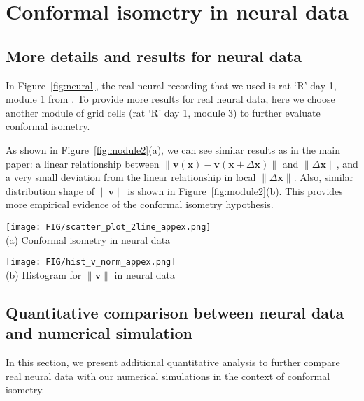 \documentclass{article}
\def\Figref#1{Figure~\ref{#1}}
\def\vv{{\bm{v}}}
\def\vx{{\bm{x}}}
\begin{document}
\section{Conformal isometry in neural data}\label{sec:neural_data}

\subsection{More details and results for neural data}
In \Figref{fig:neural}, the real neural recording that we used is rat ‘R’ day 1, module 1 from \cite{gardner2021toroidal}. To provide more results for real neural data, here we choose another module of grid cells (rat ‘R’ day 1, module 3) to further evaluate conformal isometry. 

As shown in \Figref{fig:module2}(a), we can see similar results as in the main paper: a linear relationship between $\|\vv(\vx)- \vv(\vx+\Delta \vx)\|$ and $\|\Delta \vx\|$, and a very small deviation from the linear relationship in local $\|\Delta \vx\|$. Also, similar distribution shape of $\|\vv\|$ is shown in \Figref{fig:module2}(b). 
This provides more empirical evidence of the conformal isometry hypothesis. 

\begin{figure*}[ht]
   \centering
   \begin{minipage}[b]{.45\textwidth}
  \centering         
   \texttt{[image: FIG/scatter\_plot\_2line\_appex.png]}
   \\
   {\small (a) Conformal isometry in neural data}
   \end{minipage}
   \begin{minipage}[b]{.45\textwidth}
  \centering
  \texttt{[image: FIG/hist\_v\_norm\_appex.png]}
    \\
   {\small (b) Histogram for $\|\vv\|$ in neural data}
   \end{minipage}
   \caption{\small Results for a different module of grid cells. }
   \label{fig:module2}
\end{figure*}

\subsection{Quantitative comparison between neural data and numerical simulation}

In this section, we present additional quantitative analysis to further compare real neural data with our numerical simulations in the context of conformal isometry.
\end{document}
